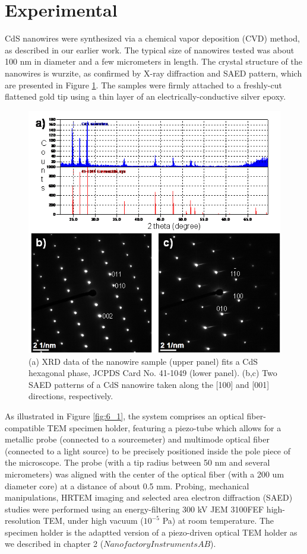 \section{Experimental}
CdS nanowires were synthesized via a chemical vapor deposition (CVD) method, as described in our earlier work.\cite{Zhang2015} The typical size of nanowires tested was about 100 nm in diameter and a few micrometers in length. The crystal structure of the nanowires is wurzite, as confirmed by X-ray diffraction and SAED pattern, which are presented in Figure \ref{fig:6_s1}. The samples were firmly attached to a freshly-cut flattened gold tip using a thin layer of an electrically-conductive silver epoxy. \\

\begin{figure}  
\includegraphics[width=\textwidth]{figures/figure6_s1}
\caption[CdS crystallography]
{(a) XRD data of the nanowire sample (upper panel) fits a CdS hexagonal phase, JCPDS Card No. 41-1049 (lower panel). (b,c) Two SAED patterns of a CdS nanowire taken along the [100] and [001] directions, respectively. 
\label{fig:6_s1}}
\end{figure}


As illustrated in Figure \ref{fig:6_1}, the system comprises an optical fiber-compatible TEM specimen holder, featuring a piezo-tube which allows for a metallic probe (connected to a sourcemeter) and multimode optical fiber (connected to a light source) to be precisely positioned inside the pole piece of the microscope. The probe (with a tip radius between 50 nm and several micrometers) was aligned with the center of the optical fiber (with a 200 um diameter core) at a distance of about 0.5 mm. Probing, mechanical manipulations, HRTEM imaging and selected area electron diffraction (SAED) studies were performed using an energy-filtering 300 kV JEM 3100FEF high-resolution TEM, under high vacuum ($10^{-5}$ Pa) at room temperature. The specimen holder is the adaptted version of a piezo-driven optical TEM holder as we described in chapter 2 ($Nanofactory Instruments AB$).\\

